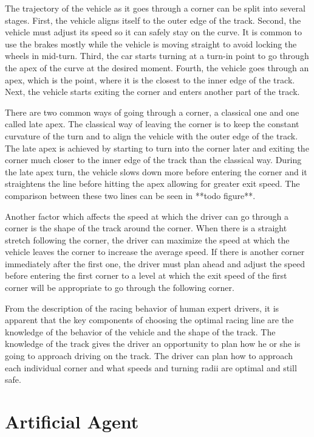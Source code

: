 The trajectory of the vehicle as it goes through a corner can be split into several stages. First, the vehicle aligns itself to the outer edge of the track. Second, the vehicle must adjust its speed so it can safely stay on the curve. It is common to use the brakes mostly while the vehicle is moving straight to avoid locking the wheels in mid-turn. Third, the car starts turning at a turn-in point to go through the apex of the curve at the desired moment. Fourth, the vehicle goes through an apex, which is the point, where it is the closest to the inner edge of the track. Next, the vehicle starts exiting the corner and enters another part of the track.

There are two common ways of going through a corner, a classical one and one called late apex. The classical way of leaving the corner is to keep the constant curvature of the turn and to align the vehicle with the outer edge of the track. The late apex is achieved by starting to turn into the corner later and exiting the corner much closer to the inner edge of the track than the classical way. During the late apex turn, the vehicle slows down more before entering the corner and it straightens the line before hitting the apex allowing for greater exit speed. The comparison between these two lines can be seen in **todo figure**.


Another factor which affects the speed at which the driver can go through a corner is the shape of the track around the corner. When there is a straight stretch following the corner, the driver can maximize the speed at which the vehicle leaves the corner to increase the average speed. If there is another corner immediately after the first one, the driver must plan ahead and adjust the speed before entering the first corner to a level at which the exit speed of the first corner will be appropriate to go through the following corner.

From the description of the racing behavior of human expert drivers, it is apparent that the key components of choosing the optimal racing line are the knowledge of the behavior of the vehicle and the shape of the track. The knowledge of the track gives the driver an opportunity to plan how he or she is going to approach driving on the track. The driver can plan how to approach each individual corner and what speeds and turning radii are optimal and still safe.

\section{Artificial Agent}


